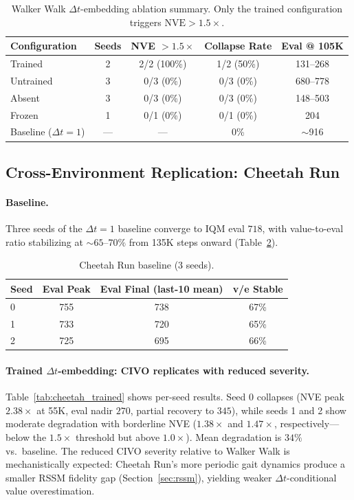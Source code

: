 \documentclass[10pt,letterpaper]{article}
\newcommand{\dt}{\Delta t}
\newcommand{\nve}{\mathrm{NVE}}
\begin{document}
\begin{table}[h]
\centering
\caption{Walker Walk $\dt$-embedding ablation summary. Only the trained configuration triggers $\nve > 1.5\times$.}
\label{tab:walker_summary}
\small
\begin{tabular}{lcccc}
\toprule
Configuration & Seeds & NVE $> 1.5\times$ & Collapse Rate & Eval @ 105K \\
\midrule
Trained       & 2 & 2/2 (100\%) & 1/2 (50\%)  & 131--268 \\
Untrained     & 3 & 0/3 (0\%)   & 0/3 (0\%)   & 680--778 \\
Absent        & 3 & 0/3 (0\%)   & 0/3 (0\%)   & 148--503 \\
Frozen        & 1 & 0/1 (0\%)   & 0/1 (0\%)   & 204 \\
\midrule
Baseline ($\dt{=}1$) & --- & --- & 0\% & $\sim$916 \\
\bottomrule
\end{tabular}
\end{table}

\subsection{Cross-Environment Replication: Cheetah Run}
\label{sec:cheetah}

\paragraph{Baseline.}
Three seeds of the $\dt{=}1$ baseline converge to IQM eval $718$, with value-to-eval ratio stabilizing at ${\sim}65$--$70\%$ from 135K steps onward (Table~\ref{tab:cheetah_baseline}).

\begin{table}[h]
\centering
\caption{Cheetah Run baseline (3 seeds).}
\label{tab:cheetah_baseline}
\small
\begin{tabular}{lccc}
\toprule
Seed & Eval Peak & Eval Final (last-10 mean) & v/e Stable \\
\midrule
0 & 755 & 738 & 67\% \\
1 & 733 & 720 & 65\% \\
2 & 725 & 695 & 66\% \\
\bottomrule
\end{tabular}
\end{table}

\paragraph{Trained $\dt$-embedding: CIVO replicates with reduced severity.}
Table~\ref{tab:cheetah_trained} shows per-seed results.
Seed 0 collapses (NVE peak $2.38\times$ at 55K, eval nadir $270$, partial recovery to $345$), while seeds 1 and 2 show moderate degradation with borderline NVE ($1.38\times$ and $1.47\times$, respectively---below the $1.5\times$ threshold but above $1.0\times$).
Mean degradation is $34\%$ vs.\ baseline.
The reduced CIVO severity relative to Walker Walk is mechanistically expected: Cheetah Run's more periodic gait dynamics produce a smaller RSSM fidelity gap (Section~\ref{sec:rssm}), yielding weaker $\dt$-conditional value overestimation.
\end{document}
